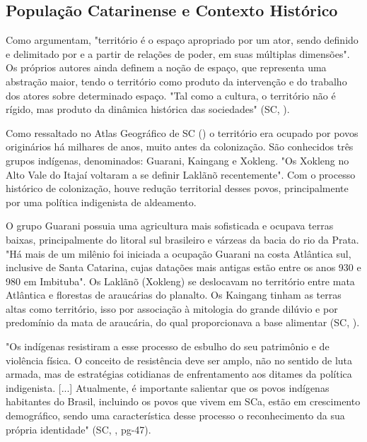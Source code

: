 \subsection{População Catarinense e Contexto Histórico}

\indent Como  argumentam, "território é o espaço apropriado por um ator, sendo definido e delimitado por e a partir de relações de poder, em suas múltiplas dimensões". Os próprios autores ainda definem a noção de espaço, que representa uma abstração maior, tendo o território como produto da intervenção e do trabalho dos atores sobre determinado espaço. "Tal como a cultura, o território não é rígido, mas produto da dinâmica histórica das sociedades" (\acrlong{SC}, \citeyear{AtlasSCpopulacao}).

\indent Como ressaltado no Atlas Geográfico de \acrlong{SC} (\citeyear{AtlasSCpopulacao}) o território era ocupado por povos originários há milhares de anos, muito antes da colonização. São conhecidos três grupos indígenas, denominados: Guarani, Kaingang e Xokleng. "Os Xokleng no Alto Vale do Itajaí voltaram a se definir Laklãnõ recentemente". Com o processo histórico de colonização, houve redução  territorial desses povos, principalmente por uma política indigenista de aldeamento.

\indent O grupo Guarani possuia uma agricultura mais sofisticada e ocupava terras baixas, principalmente do litoral sul brasileiro e várzeas da bacia do rio da Prata. "Há mais de um milênio foi iniciada a ocupação Guarani na costa Atlântica sul, inclusive de Santa Catarina, cujas datações mais antigas estão entre os anos 930 e 980 em Imbituba". Os Laklãnõ (Xokleng) se deslocavam no território entre mata Atlântica e florestas de araucárias do planalto. Os Kaingang tinham as terras altas como território, isso por associação à mitologia do grande dilúvio e por predomínio da mata de araucária, do qual proporcionava a base alimentar (\acrlong{SC}, \citeyear{AtlasSCpopulacao}).

\begin{citacao}
"Os indígenas resistiram a esse processo de esbulho do seu patrimônio e de violência
física. O conceito de resistência deve ser amplo, não no sentido de luta armada, mas
de estratégias cotidianas de enfrentamento aos ditames da política indigenista. [...] Atualmente, é importante salientar que os povos indígenas habitantes do Brasil, incluindo os povos que vivem em \acrlong{SC}a, estão em crescimento demográfico, sendo uma característica desse processo o reconhecimento da sua própria identidade" (\acrlong{SC}, \citeyear{AtlasSCpopulacao}, pg-47).
\end{citacao}

